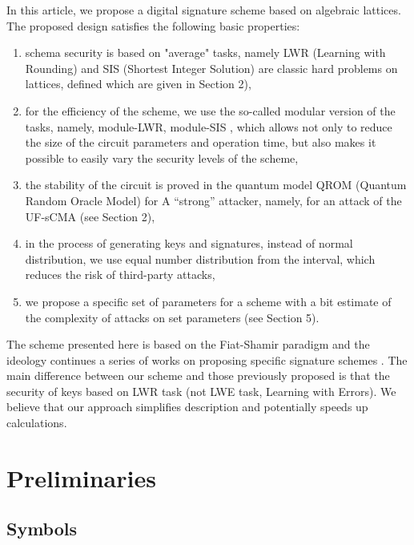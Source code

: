 \documentclass{article}
\theoremstyle{plain}
\theoremstyle{definition}
\begin{document}
    In this article, we propose a digital signature scheme based on algebraic lattices. The proposed design satisfies the following basic properties:
    \begin{enumerate}
        \item schema security is based on "average" tasks, namely LWR (Learning with Rounding) and SIS (Shortest Integer Solution) are classic hard problems on lattices, defined which are given in Section 2),
        \item for the efficiency of the scheme, we use the so-called modular version of the tasks, namely, module-LWR, module-SIS \cite{LS15}, which allows not only to reduce the size of the circuit parameters and operation time, but also makes it possible to easily vary the security levels of the scheme,
        \item the stability of the circuit is proved in the quantum model QROM (Quantum Random Oracle Model) for A “strong” attacker, namely, for an attack of the UF-sCMA (see Section 2),
        \item in the process of generating keys and signatures, instead of normal distribution, we use equal number distribution from the interval, which reduces the risk of third-party attacks,
        \item we propose a specific set of parameters for a scheme with a bit estimate of the complexity of attacks on set parameters (see Section 5).
    \end{enumerate}

    The scheme presented here is based on the Fiat-Shamir paradigm \cite{FS87, Lyu09} and the ideology continues a series of works on proposing specific signature schemes \cite{BG14, DKL+18, ABB+17}. The main difference between our scheme and those previously proposed is that the security of keys based on LWR task (not LWE task, Learning with Errors). We believe that our approach simplifies description and potentially speeds up calculations.

    \section{Preliminaries}
    \label{sec:preliminaries}
    
    \subsection{Symbols}
    \label{sec:symbols}
\end{document}
